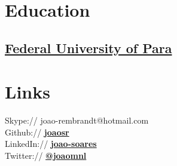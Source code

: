 \documentclass[]{joaosoares-resume}
\begin{document}
\lastupdated



\begin{minipage}[t]{0.35\textwidth} 


\section{Education}

\subsection{\href{http://www.portal.ufpa.br/}{Federal University of Para}}
\sectionsep


\section{Links} 
Skype:// joao-rembrandt@hotmail.com \\
Github:// \href{https://github.com/joaosr}{\bf joaosr} \\
LinkedIn://  \href{www.linkedin.com/in/joao-soares}{\bf joao-soares} \\
Twitter://  \href{https://twitter.com/joao_mnl}{\bf @joao\underline{\hspace{.10in}}mnl}\\
\sectionsep


\end{minipage}
\end{document}
